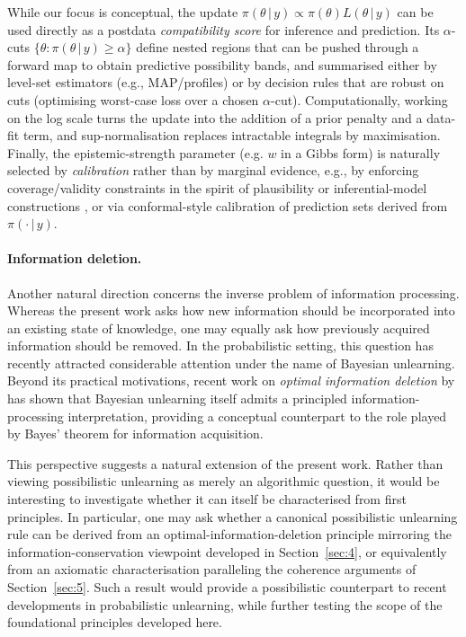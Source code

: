 \documentclass[accepted]{uai2026} %
\def\given{\,|\,}
\theoremstyle{remark}
\begin{document}
While our focus is conceptual, the update $\pi(\theta\given y)\propto \pi(\theta) L(\theta\given y)$ can be used directly as a postdata \emph{compatibility score} for inference and prediction. Its $\alpha$-cuts $\{\theta:\pi(\theta\given y)\ge \alpha\}$ define nested regions that can be pushed through a forward map to obtain predictive possibility bands, and summarised either by level-set estimators (e.g., MAP/profiles) or by decision rules that are robust on cuts (optimising worst-case loss over a chosen $\alpha$-cut). Computationally, working on the log scale turns the update into the addition of a prior penalty and a data-fit term, and sup-normalisation replaces intractable integrals by maximisation. Finally, the epistemic-strength parameter (e.g. $w$ in a Gibbs form) is naturally selected by \emph{calibration} rather than by marginal evidence, e.g., by enforcing coverage/validity constraints in the spirit of plausibility or inferential-model constructions \citep{martin2026possibilistic}, or via conformal-style calibration of prediction sets derived from $\pi(\cdot\given y)$.

\paragraph{Information deletion.} Another natural direction concerns the inverse problem of information processing. Whereas the present work asks how new information should be incorporated into an existing state of knowledge, one may equally ask how previously acquired information should be removed. In the probabilistic setting, this question has recently attracted considerable attention under the name of Bayesian unlearning. Beyond its practical motivations, recent work on \emph{optimal information deletion} by \cite{montcho2026optimal} has shown that Bayesian unlearning itself admits a principled information-processing interpretation, providing a conceptual counterpart to the role played by Bayes' theorem for information acquisition.

This perspective suggests a natural extension of the present work. Rather than viewing possibilistic unlearning as merely an algorithmic question, it would be interesting to investigate whether it can itself be characterised from first principles. In particular, one may ask whether a canonical possibilistic unlearning rule can be derived from an optimal-information-deletion principle mirroring the information-conservation viewpoint developed in Section~\ref{sec:4}, or equivalently from an axiomatic characterisation paralleling the coherence arguments of Section~\ref{sec:5}. Such a result would provide a possibilistic counterpart to recent developments in probabilistic unlearning, while further testing the scope of the foundational principles developed here.
\end{document}
